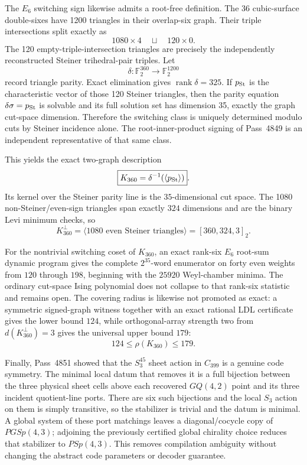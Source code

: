 The $E_6$ switching sign likewise admits a root-free definition.  The 36 cubic-surface double-sixes have 1200 triangles in their overlap-six graph.  Their triple intersections split exactly as
\[
 1080\times4\quad\sqcup\quad120\times0.
\]
The 120 empty-triple-intersection triangles are precisely the independently reconstructed Steiner trihedral-pair triples.  Let
\[
 \delta:\mathbb F_2^{360}\longrightarrow\mathbb F_2^{1200}
\]
record triangle parity.  Exact elimination gives $\operatorname{rank}\delta=325$.  If $p_{\rm St}$ is the characteristic vector of those 120 Steiner triangles, then the parity equation $\delta\sigma=p_{\rm St}$ is solvable and its full solution set has dimension 35, exactly the graph cut-space dimension.  Therefore the switching class is uniquely determined modulo cuts by Steiner incidence alone.  The root-inner-product signing of Pass~4849 is an independent representative of that same class.

This yields the exact two-graph description
\[
 \boxed{K_{360}=\delta^{-1}(\langle p_{\rm St}\rangle)}.
\]
Its kernel over the Steiner parity line is the $35$-dimensional cut space.  The 1080 non-Steiner/even-sign triangles span exactly $324$ dimensions and are the binary Levi minimum checks, so
\[
 K_{360}^{\perp}=\langle\text{1080 even Steiner triangles}\rangle=[360,324,3]_2.
\]

For the nontrivial switching coset of $K_{360}$, an exact rank-six $E_6$ root-sum dynamic program gives the complete $2^{35}$-word enumerator on forty even weights from $120$ through $198$, beginning with the $25920$ Weyl-chamber minima.  The ordinary cut-space Ising polynomial does not collapse to that rank-six statistic and remains open.  The covering radius is likewise not promoted as exact: a symmetric signed-graph witness together with an exact rational LDL certificate gives the lower bound $124$, while orthogonal-array strength two from $d(K_{360}^{\perp})=3$ gives the universal upper bound $179$:
\[
 \boxed{124\le \rho(K_{360})\le179}.
\]

Finally, Pass~4851 showed that the $S_3^{45}$ sheet action in $C_{399}$ is a genuine code symmetry.  The minimal local datum that removes it is a full bijection between the three physical sheet cells above each recovered $GQ(4,2)$ point and its three incident quotient-line ports.  There are six such bijections and the local $S_3$ action on them is simply transitive, so the stabilizer is trivial and the datum is minimal.  A global system of these port matchings leaves a diagonal/cocycle copy of $PGSp(4,3)$; adjoining the previously certified global chirality choice reduces that stabilizer to $PSp(4,3)$.  This removes compilation ambiguity without changing the abstract code parameters or decoder guarantee.
